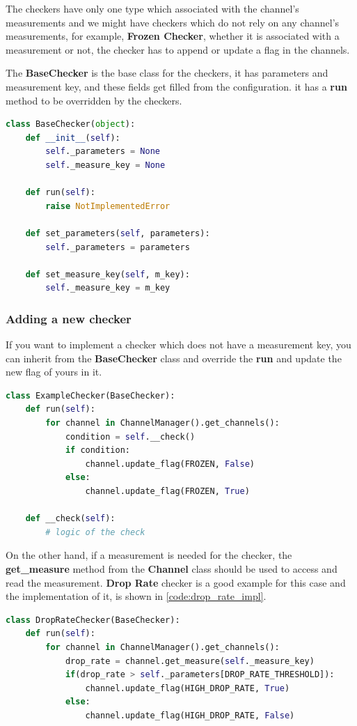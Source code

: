 The checkers have only one type which associated with the channel's measurements and we might have checkers
which do not rely on any channel's measurements, for example, \textbf{Frozen Checker}, whether it is associated
with a measurement or not, the checker has to append or update a flag in the channels.

The \textbf{BaseChecker} is the base class for the checkers, it has parameters and measurement key, 
and these fields get filled from the configuration. it has a \textbf{run} method to be overridden by 
the checkers.
\newline
\begin{lstlisting}[language=Python, caption={BaseChecker implementation},captionpos=b]
class BaseChecker(object):
    def __init__(self):
        self._parameters = None
        self._measure_key = None

    def run(self):
        raise NotImplementedError

    def set_parameters(self, parameters):
        self._parameters = parameters

    def set_measure_key(self, m_key):
        self._measure_key = m_key

\end{lstlisting}

\subsubsection{Adding a new checker}
If you want to implement a checker which does not have a measurement key, you can inherit from the \textbf{BaseChecker}
class and override the \textbf{run} and update the new flag of yours in it.

\begin{lstlisting}[language=Python, caption={Checker without a measurement key example},captionpos=b]
class ExampleChecker(BaseChecker):
	def run(self):
		for channel in ChannelManager().get_channels():
			condition = self.__check()
			if condition:
				channel.update_flag(FROZEN, False)
			else:
				channel.update_flag(FROZEN, True)

	def __check(self):
		# logic of the check
\end{lstlisting}

On the other hand, if a measurement is needed for the checker, the \textbf{get\_measure} method from the 
\textbf{Channel} class should be used to access and read the measurement. \textbf{Drop Rate} checker is 
a good example for this case and the implementation of it, is shown in \ref{code:drop_rate_impl}.
\newline
\begin{lstlisting}[language=Python,label={code:drop_rate_impl}, caption={Drop Rate checker's implementation},captionpos=b]
class DropRateChecker(BaseChecker):
    def run(self):
        for channel in ChannelManager().get_channels():
            drop_rate = channel.get_measure(self._measure_key)
            if(drop_rate > self._parameters[DROP_RATE_THRESHOLD]):
                channel.update_flag(HIGH_DROP_RATE, True)
            else:
                channel.update_flag(HIGH_DROP_RATE, False)
\end{lstlisting}

